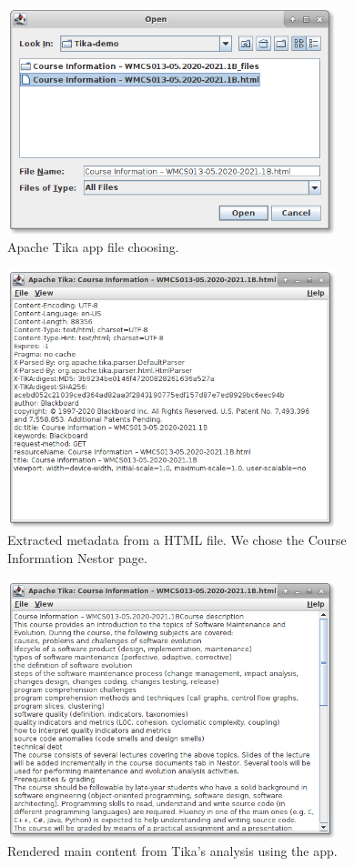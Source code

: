 \documentclass{article}
\begin{document}
\begin{figure}
    \centering
    \includegraphics[width=0.85\textwidth]{report/images/tika_app/tika_app-filechooser.png}
    \caption{Apache Tika app file choosing.}
    \label{fig:tika_app/filechooser}
\end{figure}
\begin{figure}
    \centering
    \includegraphics[width=0.85\textwidth]{report/images/tika_app/tika_app-metadata.png}
    \caption{Extracted metadata from a HTML file. We chose the Course Information Nestor page.}
    \label{fig:tika_app/metadata}
\end{figure}
\begin{figure}
    \centering
    \includegraphics[width=0.85\textwidth]{report/images/tika_app/tika_app-maincontent.png}
    \caption{Rendered main content from Tika's analysis using the app.}
    \label{fig:tika_app/maincontent}
\end{figure}
\end{document}
